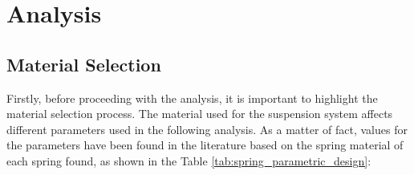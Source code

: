 \documentclass[11pt]{article}
\begin{document}
\begin{table}[H]
    \centering
\end{table}

\newpage

\section{Analysis}
\subsection{Material Selection}
Firstly, before proceeding with the analysis, it is important to highlight the material selection process. The material used for the suspension system affects different parameters used in the following analysis. As a matter of fact, values for the parameters have been found in the literature based on the spring material of each spring found, as shown in the Table \ref{tab:spring_parametric_design}:
\end{document}

